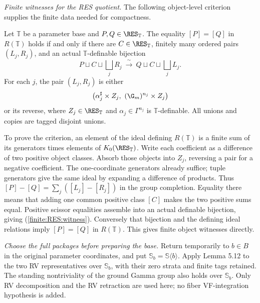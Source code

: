 \medskip
\noindent\emph{Finite witnesses for the RES quotient.}
The following object-level criterion supplies the finite
data needed for compactness.

\begin{test}\label{test}
Let $\mathbb T$ be a parameter base and
$P,Q\in\RES_{\mathbb T}$.
The equality $[P]=[Q]$ in $R(\mathbb T)$ holds if and only if
there are $C\in\RES_{\mathbb T}$, finitely many ordered pairs
$(L_j,R_j)$, and an actual $\mathbb T$-definable bijection
\begin{equation}\label{finite:RES:witness}
 P\sqcup C\sqcup\bigsqcup_j R_j
       \ \xrightarrow{\ \sim\ }\
 Q\sqcup C\sqcup\bigsqcup_j L_j .
\end{equation}
For each $j$, the pair $(L_j,R_j)$ is either
\[
 \bigl(\alpha_j^\sharp\times Z_j,\
              (\G_m)^{n_j}\times Z_j\bigr)
\]
or its reverse, where
$Z_j\in\RES_{\mathbb T}$ and
$\alpha_j\in\Gamma^{n_j}$ is $\mathbb T$-definable.
All unions and copies are tagged disjoint unions.
\end{test}

To prove the criterion, an element of the ideal defining
$R(\mathbb T)$ is a finite sum of its generators times
elements of $K_0(\RES_{\mathbb T})$.
Write each coefficient as a difference of two positive
object classes. Absorb those objects into $Z_j$, reversing
a pair for a negative coefficient.
The one-coordinate generators already suffice; tuple
generators give the same ideal by expanding a difference
of products.
Thus $[P]-[Q]=\sum_j([L_j]-[R_j])$ in the group completion.
Equality there means that adding one common positive class
$[C]$ makes the two positive sums equal.
Positive scissor equalities assemble into an actual
definable bijection, giving
(\ref{finite:RES:witness}).
Conversely that bijection and the defining ideal relations
imply $[P]=[Q]$ in $R(\mathbb T)$.
This gives finite object witnesses directly.

\medskip
\noindent\emph{Choose the full packages before preparing the base.}
Return temporarily to $b\in B$ in the original parameter
coordinates, and put $\mathbb S_b=\mathbb S\langle b\rangle$.
Apply Lemma 5.12 to the two RV representatives over
$\mathbb S_b$, with their zero strata and finite tags retained.
The standing nontriviality of the ground Gamma group
also holds over $\mathbb S_b$.
Only RV decomposition and the RV retraction are used here;
no fiber VF-integration hypothesis is added.

